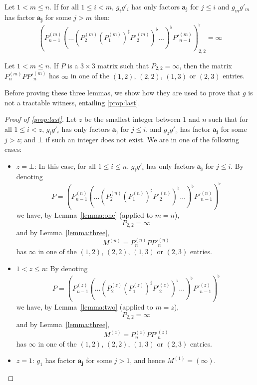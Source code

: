 \documentclass{lmcs}
\theoremstyle{remark}
\theoremstyle{remark}
\begin{document}
\begin{lem}
\label{lemma:two}
Let $1< m\leq n$. If for all $1\leq i < m$, $g_ig'_i$ has only factors $\boldsymbol{a_j}$ for $j\leq i$ and $g_mg'_m$ has factor $\boldsymbol{a_j}$ for some $j> m$ then:
$$(P^{(m)}_{n-1} (\ldots (P^{(m)}_2 (P^{(m)}_1)^\sharp P'^{(m)}_2)^\flat \ldots)^\flat P'^{(m)}_{n-1})^\flat_{2,2} = \infty$$
\end{lem}

\begin{lem}
\label{lemma:three}
Let $1< m\leq n$. If $P$ is a $3\times 3$ matrix such that $P_{2,2} = \infty$, then the matrix $P^{(m)}_{n} P P'^{(m)}_{n}$ has $\infty$ in one of the $(1,2)$, $(2,2)$, $(1,3)$ or $(2,3)$ entries. 
\end{lem}

Before proving these three lemmas,  we show how they are used to prove that $g$ is not a tractable witness, entailing \cref{prop:last}.

\begin{proof}[Proof of \cref{prop:last}]
Let $z$ be the smallest integer between $1$ and $n$ such that for all $1\leq i <z$, $g_ig'_i$ has only factors $\boldsymbol{a_j}$ for $j\leq i$, and $g_zg'_z$ has factor $\boldsymbol{a_j}$ for some $j> z$; and $\bot$ if such an integer does not exist. We are in one of the following cases:
\begin{itemize}
    \item $z = \bot$: In this case, for all $1\leq i \leq n$, $g_ig'_i$ has only factors $\boldsymbol{a_j}$ for $j\leq i$.
    By denoting
    $$P = (P^{(n)}_{n-1} (\ldots (P^{(n)}_2 (P^{(n)}_1)^\sharp P'^{(n)}_2)^\flat \ldots)^\flat P'^{(n)}_{n-1})^\flat$$
    we have, by Lemma~\ref{lemma:one} (applied to $m=n$), 
    $$P_{2,2} = \infty$$
    and by Lemma~\ref{lemma:three}, 
    $$M^{(n)} = P^{(n)}_{n} P P'^{(n)}_{n}$$
    has $\infty$ in one of the $(1,2)$, $(2,2)$, $(1,3)$ or $(2,3)$ entries. 
    \item $1 < z \leq n$: By denoting
    $$P = (P^{(z)}_{n-1} (\ldots (P^{(z)}_2 (P^{(z)}_1)^\sharp P'^{(z)}_2)^\flat \ldots)^\flat P'^{(z)}_{n-1})^\flat$$
    we have, by Lemma~\ref{lemma:two} (applied to $m=z$), 
    $$P_{2,2} = \infty$$
    and by Lemma~\ref{lemma:three}, 
    $$M^{(z)} = P^{(z)}_{n} P P'^{(z)}_{n}$$
    has $\infty$ in one of the $(1,2)$, $(2,2)$, $(1,3)$ or $(2,3)$ entries.  
    \item $z=1$: $g_1$ has factor $\boldsymbol{a_j}$ for some $j> 1$, and hence $M^{(1)} = (\infty)$.\qedhere
\end{itemize}
\end{proof}
\end{document}
